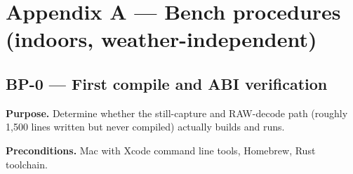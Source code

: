 \documentclass[11pt]{article}
\begin{document}
\section*{Appendix A --- Bench procedures (indoors, weather-independent)}

\subsection*{BP-0 --- First compile and ABI verification}

\textbf{Purpose.} Determine whether the still-capture and RAW-decode path
(roughly 1,500 lines written but never compiled) actually builds and runs.

\textbf{Preconditions.} Mac with Xcode command line tools, Homebrew, Rust
toolchain.
\end{document}
